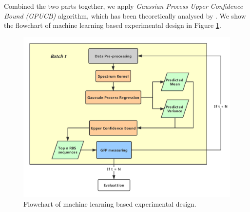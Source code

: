 Combined the two parts together, we apply \textit{Gaussian Process Upper Confidence Bound (GPUCB)} algorithm, which has been theoretically analysed by \textcite{srinivas2012information}. We show the flowchart of machine learning based experimental design in Figure \ref{fig: flowchart of machine learning based experimental design.}.


\begin{figure}[t]
    \centering
    \includegraphics[scale=0.35]{plots/flowchart.pdf}
    \caption{Flowchart of machine learning based experimental design.}
    \label{fig: flowchart of machine learning based experimental design.}
\end{figure}





